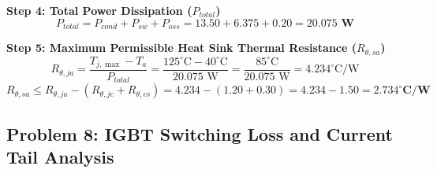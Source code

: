 \documentclass[11pt,a4paper]{article}
\begin{document}
\begin{examplebox}
\textbf{Step 4: Total Power Dissipation ($P_{total}$)}
\begin{equation}
P_{total} = P_{cond} + P_{sw} + P_{oss} = 13.50 + 6.375 + 0.20 = \mathbf{20.075\text{ W}}
\end{equation}

\textbf{Step 5: Maximum Permissible Heat Sink Thermal Resistance ($R_{\theta,sa}$)}
\begin{equation}
R_{\theta,ja} = \frac{T_{j,\max} - T_a}{P_{total}} = \frac{125^\circ\text{C} - 40^\circ\text{C}}{20.075\text{ W}} = \frac{85^\circ\text{C}}{20.075\text{ W}} = 4.234^\circ\text{C/W}
\end{equation}
\begin{equation}
R_{\theta,sa} \le R_{\theta,ja} - (R_{\theta,jc} + R_{\theta,cs}) = 4.234 - (1.20 + 0.30) = 4.234 - 1.50 = \mathbf{2.734^\circ\text{C/W}}
\end{equation}
\end{examplebox}

\subsection{Problem 8: IGBT Switching Loss and Current Tail Analysis}
\end{document}
